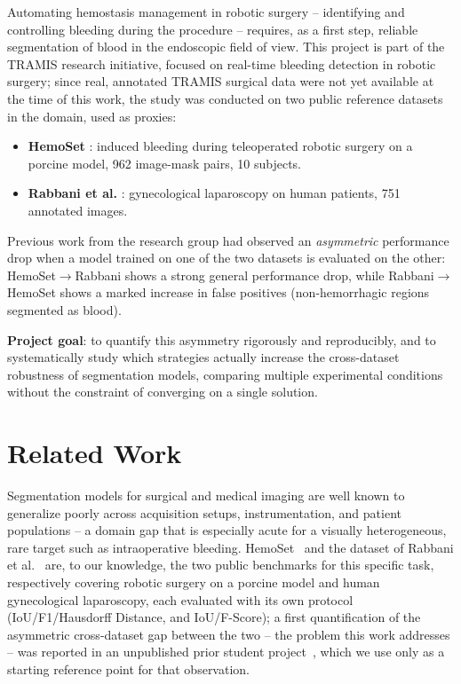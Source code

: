 \documentclass[10pt,conference]{IEEEtran}
\begin{document}
Automating hemostasis management in robotic surgery -- identifying and controlling bleeding during the procedure -- requires, as a first step, reliable segmentation of blood in the endoscopic field of view. This project is part of the TRAMIS research initiative, focused on real-time bleeding detection in robotic surgery; since real, annotated TRAMIS surgical data were not yet available at the time of this work, the study was conducted on two public reference datasets in the domain, used as proxies:

\begin{itemize}
\item \textbf{HemoSet} \cite{miao2024hemoset}: induced bleeding during teleoperated robotic surgery on a porcine model, 962 image-mask pairs, 10 subjects.
\item \textbf{Rabbani et al.} \cite{rabbani2022midl}: gynecological laparoscopy on human patients, 751 annotated images.
\end{itemize}

Previous work from the research group \cite{giusti2026report} had observed an \emph{asymmetric} performance drop when a model trained on one of the two datasets is evaluated on the other: HemoSet$\rightarrow$Rabbani shows a strong general performance drop, while Rabbani$\rightarrow$HemoSet shows a marked increase in false positives (non-hemorrhagic regions segmented as blood).

\textbf{Project goal}: to quantify this asymmetry rigorously and reproducibly, and to systematically study which strategies actually increase the cross-dataset robustness of segmentation models, comparing multiple experimental conditions without the constraint of converging on a single solution.

\section{Related Work}
\label{sec:related}

Segmentation models for surgical and medical imaging are well known to generalize poorly across acquisition setups, instrumentation, and patient populations -- a domain gap that is especially acute for a visually heterogeneous, rare target such as intraoperative bleeding. HemoSet~\cite{miao2024hemoset} and the dataset of Rabbani et al.~\cite{rabbani2022midl} are, to our knowledge, the two public benchmarks for this specific task, respectively covering robotic surgery on a porcine model and human gynecological laparoscopy, each evaluated with its own protocol (IoU/F1/Hausdorff Distance, and IoU/F-Score); a first quantification of the asymmetric cross-dataset gap between the two -- the problem this work addresses -- was reported in an unpublished prior student project~\cite{giusti2026report}, which we use only as a starting reference point for that observation.
\end{document}
